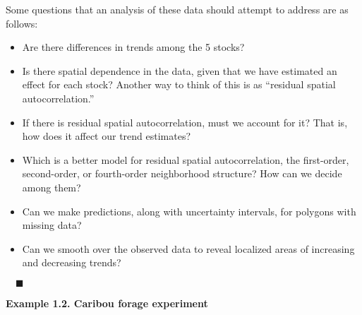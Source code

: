 Some questions that an analysis of these data should attempt to address are as follows:
\begin{itemize}
\item Are there differences in trends among the 5 stocks?
\item Is there spatial dependence in the data, given that we have estimated an effect for each stock? Another way to think of this is as ``residual spatial autocorrelation.''
\item If there is residual spatial autocorrelation, must we account for it?  That is, how does it affect our trend estimates?
\item Which is a better model for residual spatial autocorrelation, the first-order, second-order, or fourth-order neighborhood structure?  How can we decide among them?
\item Can we make predictions, along with uncertainty intervals, for polygons with missing data?
\item Can we smooth over the observed data to reveal localized areas of increasing and decreasing trends?
\end{itemize}

$\quad\blacksquare$
\vspace{.5in}

\begin{tcolorbox}
{\bf Example 1.2.  Caribou forage experiment}
\end{tcolorbox}
\vspace{.1in}

